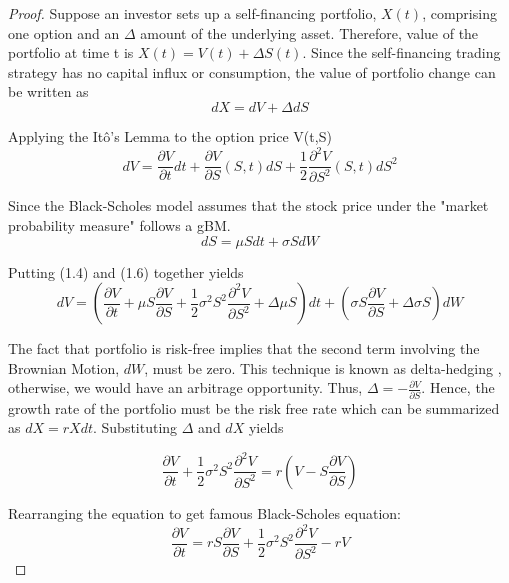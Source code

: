 \documentclass[12pt, oneside]{book}
\theoremstyle{plain}
\theoremstyle{definition}
\begin{document}
\begin{proof}
Suppose an investor sets up a self-financing portfolio,  $ X(t)$, comprising one option and an $\Delta$ amount of the underlying asset. Therefore, value of the portfolio at time t is $X(t) = V(t) + \Delta S(t)$. 
Since the self-financing trading strategy has no capital influx or consumption, the value of portfolio change can be written as 
\begin{equation}
dX = dV + \Delta dS
\end{equation}

Applying the It\^{o}'s Lemma to the option price V(t,S)
\begin{equation}
dV = \frac{\partial V}{\partial t} dt + \frac{\partial V}{\partial S} (S,t) dS + \frac{1}{2}\frac{\partial^2 V}{\partial S^2}(S,t)dS^2
\end{equation}

Since the Black-Scholes model assumes that the stock price under the "market probability measure" follows a gBM. 
\begin{equation}
dS = \mu S dt + \sigma S dW
\end{equation}

Putting (1.4) and (1.6) together yields
\begin{equation}
dV = (\frac{\partial V}{\partial t} + \mu S \frac{\partial V}{\partial S} + \frac{1}{2} \sigma^2 S^2 \frac{\partial^2 V}{\partial S^2} + \Delta \mu S) dt + (\sigma S \frac{\partial V}{\partial S}+\Delta \sigma S) dW
\end{equation}

The fact that portfolio is risk-free implies that the second term involving the Brownian Motion, $dW$, must be zero.  This technique is known as delta-hedging , otherwise, we would have an arbitrage opportunity. Thus, $ \Delta = - \frac{\partial V}{\partial S}$.  Hence, the growth rate of the portfolio must be the risk free rate which can be summarized as $ dX = r X dt $. Substituting $\Delta$ and $dX$ yields

\begin{equation}
\frac{\partial V}{\partial t} + \frac{1}{2} \sigma^2 S^2 \frac{\partial^2 V}{\partial S^2} = r(V-S\frac{\partial V}{\partial S})
\end{equation}

Rearranging the equation to get famous Black-Scholes equation:
\begin{equation}
\frac{\partial V}{\partial t} = rS\frac{\partial V}{\partial S}+\frac{1}{2} \sigma^2 S^2 \frac{\partial^2 V}{\partial S^2} - rV
\end{equation}
\end{proof} 
\end{document}
